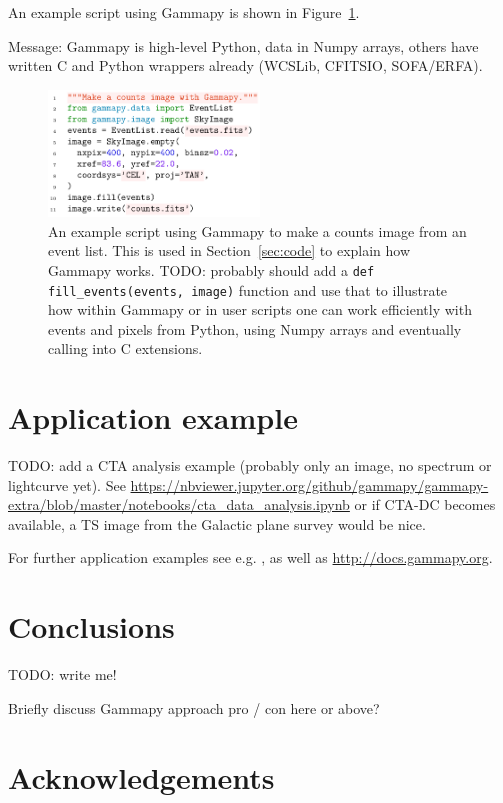 \documentclass{PoS}
\newcommand{\url}[1]{\href{#1}{#1}}
\begin{document}
An example script using Gammapy is shown in Figure~\ref{fig:code_example}.

Message: Gammapy is high-level Python, data in Numpy arrays, others have written C and Python wrappers already (WCSLib, CFITSIO, SOFA/ERFA).

\begin{figure}[t]
\centering
\includegraphics[width=0.5\textwidth]{examples/code_events_image}
\caption{
An example script using Gammapy to make a counts image from an event list.
This is used in Section~\ref{sec:code} to explain how Gammapy works.
TODO: probably should add a \texttt{def fill\_events(events, image)} function
and use that to illustrate how within Gammapy or in user scripts one can work
efficiently with events and pixels from Python, using Numpy arrays and
eventually calling into C extensions.
}
\label{fig:code_example}
\end{figure}


\section{Application example}
\label{sec:application}

TODO: add a CTA analysis example (probably only an image, no spectrum or
lightcurve yet). See
\url{https://nbviewer.jupyter.org/github/gammapy/gammapy-extra/blob/master/notebooks/cta\_data\_analysis.ipynb}
or if CTA-DC becomes available, a TS image from the Galactic plane survey would
be nice.

For further application examples see e.g. \cite{julien, roberta, cyril},
as well as \url{http://docs.gammapy.org}.

\section{Conclusions}
\label{sec:conclusions}

TODO: write me!

Briefly discuss Gammapy approach pro / con here or above?

\section{Acknowledgements}
\label{sed:acknowledgements}
\end{document}

